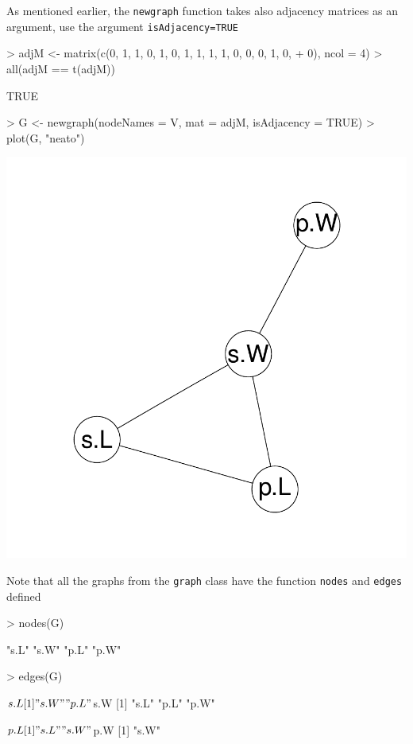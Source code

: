 \documentclass[12pt,oneside,titlepage,letter]{article}
\begin{document}
As mentioned earlier, the \texttt{newgraph} function takes also adjacency matrices as an argument, use the argument \texttt{isAdjacency=TRUE}
\begin{center}
\begin{Schunk}
\begin{Sinput}
> adjM <- matrix(c(0, 1, 1, 0, 1, 0, 1, 1, 1, 1, 0, 0, 0, 1, 0, 
+     0), ncol = 4)
> all(adjM == t(adjM))
\end{Sinput}
\begin{Soutput}
[1] TRUE
\end{Soutput}
\begin{Sinput}
> G <- newgraph(nodeNames = V, mat = adjM, isAdjacency = TRUE)
> plot(G, "neato")
\end{Sinput}
\end{Schunk}
\includegraphics{sweave_p-040}
\end{center}
Note that all the graphs from the \texttt{graph} class have the function \texttt{nodes} and \texttt{edges} defined
\begin{Schunk}
\begin{Sinput}
> nodes(G)
\end{Sinput}
\begin{Soutput}
[1] "s.L" "s.W" "p.L" "p.W"
\end{Soutput}
\begin{Sinput}
> edges(G)
\end{Sinput}
\begin{Soutput}
$s.L
[1] "s.W" "p.L"

$s.W
[1] "s.L" "p.L" "p.W"

$p.L
[1] "s.L" "s.W"

$p.W
[1] "s.W"
\end{Soutput}
\end{Schunk}
\end{document}
